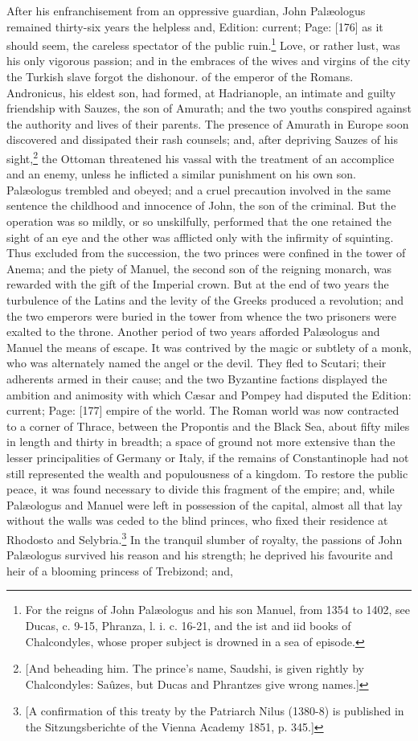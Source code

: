After his enfranchisement from an oppressive guardian, John Palæologus remained thirty-six years the helpless and, Edition: current; Page: [176] as it should seem, the careless spectator of the public ruin.\footnote{For the reigns of John Palæologus and his son Manuel, from 1354 to 1402, see Ducas, c. 9-15, Phranza, l. i. c. 16-21, and the ist and iid books of Chalcondyles, whose proper subject is drowned in a sea of episode.} Love, or rather lust, was his only vigorous passion; and in the embraces of the wives and virgins of the city the Turkish slave forgot the dishonour. of the emperor of the Romans. Andronicus, his eldest son, had formed, at Hadrianople, an intimate and guilty friendship with Sauzes, the son of Amurath; and the two youths conspired against the authority and lives of their parents. The presence of Amurath in Europe soon discovered and dissipated their rash counsels; and, after depriving Sauzes of his sight,\footnote{[And beheading him. The prince\texthebrew{}’s name, Saudshi, is given rightly by Chalcondyles: Saûzes, but Ducas and Phrantzes give wrong names.]} the Ottoman threatened his vassal with the treatment of an accomplice and an enemy, unless he inflicted a similar punishment on his own son. Palæologus trembled and obeyed; and a cruel precaution involved in the same sentence the childhood and innocence of John, the son of the criminal. But the operation was so mildly, or so unskilfully, performed that the one retained the sight of an eye and the other was afflicted only with the infirmity of squinting. Thus excluded from the succession, the two princes were confined in the tower of Anema; and the piety of Manuel, the second son of the reigning monarch, was rewarded with the gift of the Imperial crown. But at the end of two years the turbulence of the Latins and the levity of the Greeks produced a revolution; and the two emperors were buried in the tower from whence the two prisoners were exalted to the throne. Another period of two years afforded Palæologus and Manuel the means of escape. It was contrived by the magic or subtlety of a monk, who was alternately named the angel or the devil. They fled to Scutari; their adherents armed in their cause; and the two Byzantine factions displayed the ambition and animosity with which Cæsar and Pompey had disputed the Edition: current; Page: [177] empire of the world. The Roman world was now contracted to a corner of Thrace, between the Propontis and the Black Sea, about fifty miles in length and thirty in breadth; a space of ground not more extensive than the lesser principalities of Germany or Italy, if the remains of Constantinople had not still represented the wealth and populousness of a kingdom. To restore the public peace, it was found necessary to divide this fragment of the empire; and, while Palæologus and Manuel were left in possession of the capital, almost all that lay without the walls was ceded to the blind princes, who fixed their residence at Rhodosto and Selybria.\footnote{[A confirmation of this treaty by the Patriarch Nilus (1380-8) is published in the Sitzungsberichte of the Vienna Academy 1851, p. 345.]} In the tranquil slumber of royalty, the passions of John Palæologus survived his reason and his strength; he deprived his favourite and heir of a blooming princess of Trebizond; and, 